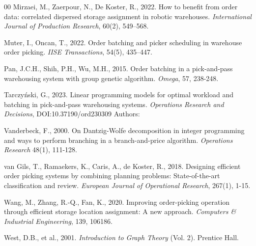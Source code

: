 \documentclass[preprint,review,11pt,authoryear]{elsarticle}
\begin{document}
\begin{thebibliography}{00}
Mirzaei, M., Zaerpour, N., De Koster, R., 2022. How to benefit from order data: correlated dispersed storage assignment in robotic warehouses. \textit{International Journal of Production Research}, 60(2), 549--568.

Muter, I., Oncan, T., 2022. Order batching and picker scheduling in warehouse order picking. \textit{IISE Transactions}, 54(5), 435--447.


Pan, J.C.H., Shih, P.H., Wu, M.H., 2015. Order batching in a pick-and-pass warehousing system with group genetic algorithm. \textit{Omega}, 57, 238-248.


Tarczyński, G., 2023. Linear programming models for optimal workload
and batching in pick-and-pass warehousing systems. \textit{Operations Research and Decisions}, DOI:10.37190/ord230309
Authors:

Vanderbeck, F., 2000. On Dantzig-Wolfe decomposition in integer programming and ways to perform branching in a branch-and-price algorithm. \textit{Operations Research} 48(1), 111-128.

van Gils, T., Ramaekers, K., Caris, A., de Koster, R., 2018. Designing efficient order picking systems by combining planning problems: State-of-the-art classification and review. \textit{European Journal of Operational Research}, 267(1), 1-15.


Wang, M., Zhang, R.-Q., Fan, K., 2020. Improving order-picking operation through efficient storage location assignment: A new approach. \textit{Computers \& Industrial Engineering}, 139, 106186.

West, D.B., et al., 2001. \textit{Introduction to Graph Theory} (Vol. 2). Prentice Hall.


\end{thebibliography}
\end{document}
